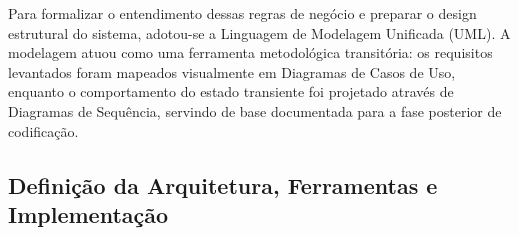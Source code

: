 
Para formalizar o entendimento dessas regras de negócio e preparar o design estrutural do sistema, adotou-se a Linguagem de Modelagem Unificada (UML). A modelagem atuou como uma ferramenta metodológica transitória: os requisitos levantados foram mapeados visualmente em Diagramas de Casos de Uso, enquanto o comportamento do estado transiente foi projetado através de Diagramas de Sequência, servindo de base documentada para a fase posterior de codificação.

\subsection{Definição da Arquitetura, Ferramentas e Implementação}

